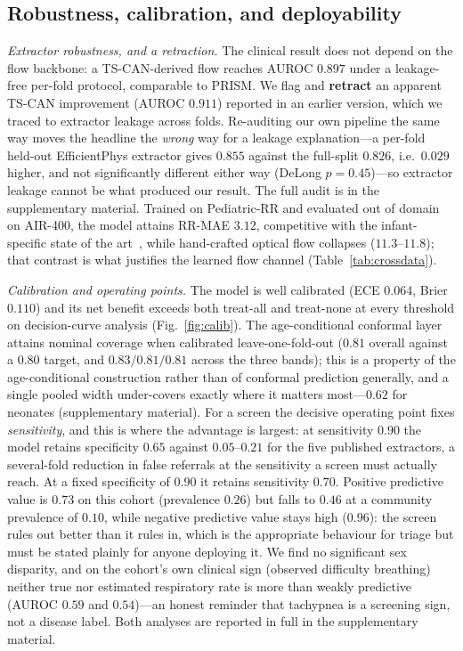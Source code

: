 \documentclass[journal]{IEEEtran}
\begin{document}
\subsection{Robustness, calibration, and deployability}\label{sec:calib}
\emph{Extractor robustness, and a retraction.} The clinical result does not depend on the flow backbone:
a TS-CAN-derived flow reaches AUROC $0.897$ under a leakage-free per-fold protocol, comparable to PRISM.
We flag and \textbf{retract} an apparent TS-CAN improvement (AUROC $0.911$) reported in an earlier
version, which we traced to extractor leakage across folds. Re-auditing our own pipeline the same way
moves the headline the \emph{wrong} way for a leakage explanation---a per-fold held-out EfficientPhys
extractor gives $0.855$ against the full-split $0.826$, i.e.\ $0.029$ higher, and not significantly
different either way (DeLong $p=0.45$)---so extractor leakage cannot be what produced our result. The
full audit is in the supplementary material. Trained on Pediatric-RR and evaluated out of domain on
AIR-400, the model attains RR-MAE $3.12$, competitive with the infant-specific state of the
art~\cite{infant_air}, while hand-crafted optical flow collapses ($11.3$--$11.8$); that contrast is what
justifies the learned flow channel (Table~\ref{tab:crossdata}).

\emph{Calibration and operating points.} The model is well calibrated (ECE $0.064$, Brier $0.110$) and
its net benefit exceeds both treat-all and treat-none at every threshold on decision-curve analysis
(Fig.~\ref{fig:calib}). The age-conditional conformal layer attains nominal coverage when calibrated
leave-one-fold-out ($0.81$ overall against a $0.80$ target, and $0.83/0.81/0.81$ across the three bands);
this is a property of the age-conditional construction rather than of conformal prediction generally, and
a single pooled width under-covers exactly where it matters most---$0.62$ for neonates (supplementary
material). For a screen the decisive operating point fixes \emph{sensitivity}, and this is where the
advantage is largest: at sensitivity $0.90$ the model retains specificity $0.65$ against $0.05$--$0.21$
for the five published extractors, a several-fold reduction in false referrals at the sensitivity a
screen must actually reach. At a fixed specificity of $0.90$ it retains sensitivity $0.70$. Positive
predictive value is $0.73$ on this cohort (prevalence $0.26$) but falls to $0.46$ at a community
prevalence of $0.10$, while negative predictive value stays high ($0.96$): the screen rules out better
than it rules in, which is the appropriate behaviour for triage but must be stated plainly for anyone
deploying it. We find no significant sex disparity, and on the cohort's own clinical sign (observed
difficulty breathing) neither true nor estimated respiratory rate is more than weakly predictive
(AUROC $0.59$ and $0.54$)---an honest reminder that tachypnea is a screening sign, not a disease label.
Both analyses are reported in full in the supplementary material.
\end{document}
